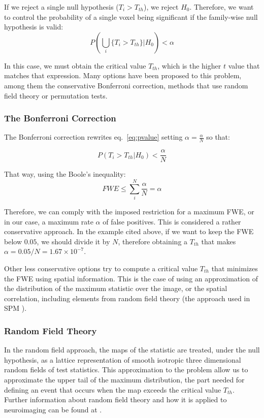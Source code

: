 If we reject a single null hypothesis ($T_i > T_{th}$), we reject $H_0$. Therefore, we want to control the probability of a single voxel being significant if the family-wise null hypothesis is valid:
\begin{equation}
P \left(\bigcup_i\{T_i > T_{th}\} | H_0\right)< \alpha
\end{equation}

In this case, we must obtain the critical value $T_{th}$, which is the higher $t$ value that matches that expression. Many options have been proposed to this problem, among them the conservative Bonferroni correction, methods that use random field theory or permutation tests. 

\subsubsection{The Bonferroni Correction}
The Bonferroni correction \cite{Shaffer1995} rewrites eq.~\ref{eq:pvalue} setting $\alpha=\frac{\alpha}{N}$ so that: 

\begin{equation}
P \left(T_i > T_{th}| H_0\right)< \frac{\alpha}{N}
\end{equation}

That way, using the Boole's inequality:
\begin{equation}
FWE \leq \sum_{i}^{N} \frac{\alpha}{N} = \alpha
\end{equation}

Therefore, we can comply with the imposed restriction for a maximum \ac{FWE}, or in our case, a maximum rate $\alpha$ of false positives. This is considered a rather conservative approach. In the example cited above, if we want to keep the \ac{FWE} below $0.05$, we should divide it by $N$, therefore obtaining a $T_{th}$ that makes $\alpha = 0.05/N = 1.67\times10^{-7}$. 

Other less conservative options try to compute a critical value $T_{th}$ that minimizes the \ac{FWE} using spatial information. This is the case of using an approximation of the distribution of the maximum statistic over the image, or the spatial correlation, including elements from random field theory (the approach used in \ac{SPM} \cite{spm_book}). 

\subsubsection{Random Field Theory}
In the random field approach, the maps of the statistic are treated, under the null hypothesis, as a lattice representation of smooth isotropic three dimensional random fields of test statistics. This approximation to the problem allow us to approximate the upper tail of the maximum distribution, the part needed for defining an event that occurs when the map exceeds the critical value $T_{th}$. Further information about random field theory and how it is applied to neuroimaging can be found at \cite{spm_book}. 

